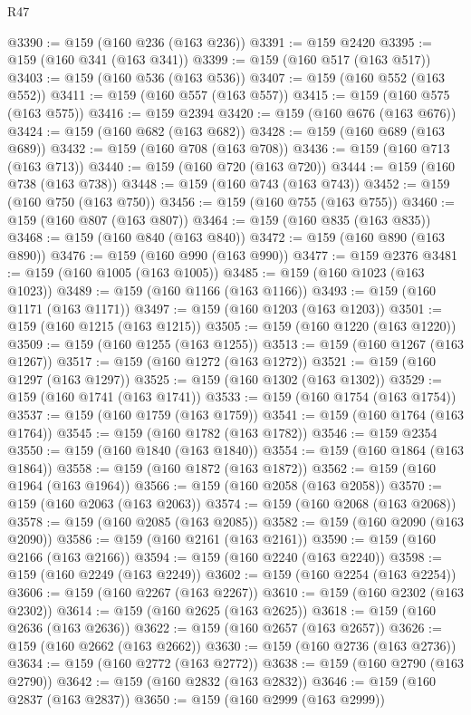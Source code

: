 \begin{lexlean}{R47}
\begin{coremodule}
@3390 := @159 (@160 @236 (@163 @236))
@3391 := @159 @2420
@3395 := @159 (@160 @341 (@163 @341))
@3399 := @159 (@160 @517 (@163 @517))
@3403 := @159 (@160 @536 (@163 @536))
@3407 := @159 (@160 @552 (@163 @552))
@3411 := @159 (@160 @557 (@163 @557))
@3415 := @159 (@160 @575 (@163 @575))
@3416 := @159 @2394
@3420 := @159 (@160 @676 (@163 @676))
@3424 := @159 (@160 @682 (@163 @682))
@3428 := @159 (@160 @689 (@163 @689))
@3432 := @159 (@160 @708 (@163 @708))
@3436 := @159 (@160 @713 (@163 @713))
@3440 := @159 (@160 @720 (@163 @720))
@3444 := @159 (@160 @738 (@163 @738))
@3448 := @159 (@160 @743 (@163 @743))
@3452 := @159 (@160 @750 (@163 @750))
@3456 := @159 (@160 @755 (@163 @755))
@3460 := @159 (@160 @807 (@163 @807))
@3464 := @159 (@160 @835 (@163 @835))
@3468 := @159 (@160 @840 (@163 @840))
@3472 := @159 (@160 @890 (@163 @890))
@3476 := @159 (@160 @990 (@163 @990))
@3477 := @159 @2376
@3481 := @159 (@160 @1005 (@163 @1005))
@3485 := @159 (@160 @1023 (@163 @1023))
@3489 := @159 (@160 @1166 (@163 @1166))
@3493 := @159 (@160 @1171 (@163 @1171))
@3497 := @159 (@160 @1203 (@163 @1203))
@3501 := @159 (@160 @1215 (@163 @1215))
@3505 := @159 (@160 @1220 (@163 @1220))
@3509 := @159 (@160 @1255 (@163 @1255))
@3513 := @159 (@160 @1267 (@163 @1267))
@3517 := @159 (@160 @1272 (@163 @1272))
@3521 := @159 (@160 @1297 (@163 @1297))
@3525 := @159 (@160 @1302 (@163 @1302))
@3529 := @159 (@160 @1741 (@163 @1741))
@3533 := @159 (@160 @1754 (@163 @1754))
@3537 := @159 (@160 @1759 (@163 @1759))
@3541 := @159 (@160 @1764 (@163 @1764))
@3545 := @159 (@160 @1782 (@163 @1782))
@3546 := @159 @2354
@3550 := @159 (@160 @1840 (@163 @1840))
@3554 := @159 (@160 @1864 (@163 @1864))
@3558 := @159 (@160 @1872 (@163 @1872))
@3562 := @159 (@160 @1964 (@163 @1964))
@3566 := @159 (@160 @2058 (@163 @2058))
@3570 := @159 (@160 @2063 (@163 @2063))
@3574 := @159 (@160 @2068 (@163 @2068))
@3578 := @159 (@160 @2085 (@163 @2085))
@3582 := @159 (@160 @2090 (@163 @2090))
@3586 := @159 (@160 @2161 (@163 @2161))
@3590 := @159 (@160 @2166 (@163 @2166))
@3594 := @159 (@160 @2240 (@163 @2240))
@3598 := @159 (@160 @2249 (@163 @2249))
@3602 := @159 (@160 @2254 (@163 @2254))
@3606 := @159 (@160 @2267 (@163 @2267))
@3610 := @159 (@160 @2302 (@163 @2302))
@3614 := @159 (@160 @2625 (@163 @2625))
@3618 := @159 (@160 @2636 (@163 @2636))
@3622 := @159 (@160 @2657 (@163 @2657))
@3626 := @159 (@160 @2662 (@163 @2662))
@3630 := @159 (@160 @2736 (@163 @2736))
@3634 := @159 (@160 @2772 (@163 @2772))
@3638 := @159 (@160 @2790 (@163 @2790))
@3642 := @159 (@160 @2832 (@163 @2832))
@3646 := @159 (@160 @2837 (@163 @2837))
@3650 := @159 (@160 @2999 (@163 @2999))

\end{coremodule}
\end{lexlean}
